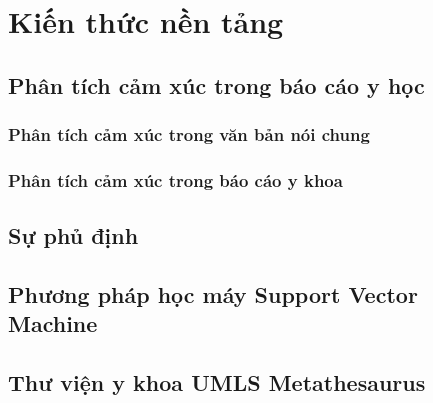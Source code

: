 \section{Kiến thức nền tảng}
\subsection{Phân tích cảm xúc trong báo cáo y học}
\subsubsection*{Phân tích cảm xúc trong văn bản nói chung}
\subsubsection*{Phân tích cảm xúc trong báo cáo y khoa}
\subsection{Sự phủ định}
\subsection{Phương pháp học máy Support Vector Machine}
\subsection{Thư viện y khoa UMLS Metathesaurus}
